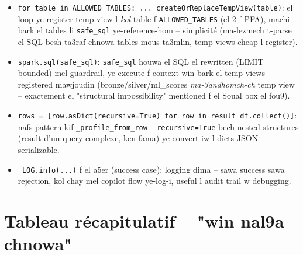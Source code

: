 \documentclass[11pt,a4paper]{report}
\DeclareRobustCommand{\code}[1]{\texttt{#1}}
\begin{document}
\begin{itemize}
  \item \code{for table in ALLOWED\_TABLES: ... createOrReplaceTempView(table)}:
        el loop ye-register temp view l \emph{kol} table f
        \code{ALLOWED\_TABLES} (el 2 f PFA), machi bark el tables li
        \code{safe\_sql} ye-reference-hom -- simplicité (ma-lezmech
        t-parse el SQL besh ta3raf chnowa tables mous-ta3mlin, temp
        views cheap l register).
  \item \code{spark.sql(safe\_sql)}: \code{safe\_sql} houwa el SQL el
        rewritten (LIMIT bounded) mel guardrail, ye-execute f context
        win bark el temp views registered mawjoudin (bronze/silver/ml\_scores
        \emph{ma-3andhomch-ch} temp view -- exactement el "structural
        impossibility" mentioned f el Soual box el fou9).
  \item \code{rows = [row.asDict(recursive=True) for row in result\_df.collect()]}:
        nafs pattern kif \code{\_profile\_from\_row} -- \code{recursive=True}
        bech nested structures (result d'un query complexe, ken fama)
        ye-convert-iw l dicts JSON-serializable.
  \item \code{\_LOG.info(...)} f el a5er (success case): logging dima --
        sawa success sawa rejection, kol chay mel copilot flow ye-log-i,
        useful l audit trail w debugging.
\end{itemize}

\chapter{Tableau récapitulatif -- "win nal9a chnowa"}
\end{document}
